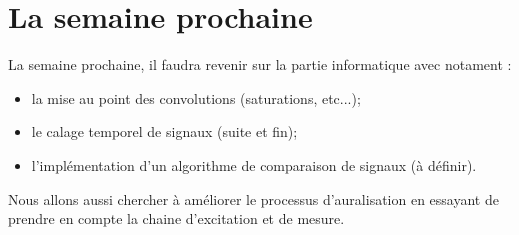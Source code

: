 \documentclass[12pt]{article}
\begin{document}
\section{La semaine prochaine}%

La semaine prochaine, il faudra revenir sur la partie informatique avec notament :

\begin{itemize}
    \item la mise au point des convolutions (saturations, etc...);
    \item le calage temporel de signaux (suite et fin);
    \item l'implémentation d'un algorithme de comparaison de signaux (à définir).
\end{itemize}

Nous allons aussi chercher à améliorer le processus d'auralisation en essayant de prendre en compte la chaine d'excitation et de mesure.

\end{document}
